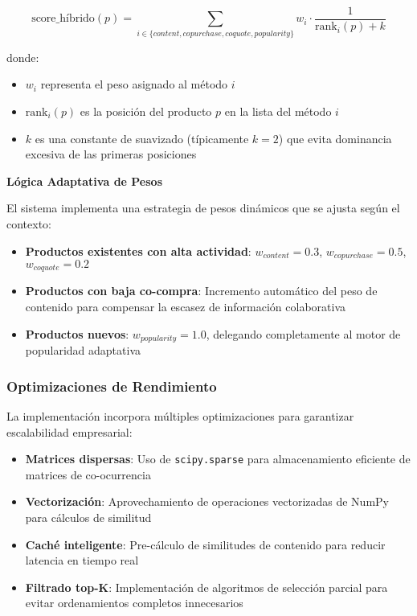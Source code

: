 \documentclass[twocolumn]{article}
\begin{document}
\[
\text{score\_híbrido}(p) = \sum_{i \in \{content, copurchase, coquote, popularity\}} w_i \cdot \frac{1}{\text{rank}_i(p) + k}
\]

donde:
\begin{itemize}
    \item $w_i$ representa el peso asignado al método $i$
    \item $\text{rank}_i(p)$ es la posición del producto $p$ en la lista del método $i$
    \item $k$ es una constante de suavizado (típicamente $k=2$) que evita dominancia excesiva de las primeras posiciones
\end{itemize}

\textbf{Lógica Adaptativa de Pesos}

El sistema implementa una estrategia de pesos dinámicos que se ajusta según el contexto:

\begin{itemize}
    \item \textbf{Productos existentes con alta actividad}: $w_{content} = 0.3$, $w_{copurchase} = 0.5$, $w_{coquote} = 0.2$
    \item \textbf{Productos con baja co-compra}: Incremento automático del peso de contenido para compensar la escasez de información colaborativa
    \item \textbf{Productos nuevos}: $w_{popularity} = 1.0$, delegando completamente al motor de popularidad adaptativa
\end{itemize}

\subsubsection{Optimizaciones de Rendimiento}

La implementación incorpora múltiples optimizaciones para garantizar escalabilidad empresarial:

\begin{itemize}
    \item \textbf{Matrices dispersas}: Uso de \texttt{scipy.sparse} para almacenamiento eficiente de matrices de co-ocurrencia
    \item \textbf{Vectorización}: Aprovechamiento de operaciones vectorizadas de NumPy para cálculos de similitud
    \item \textbf{Caché inteligente}: Pre-cálculo de similitudes de contenido para reducir latencia en tiempo real
    \item \textbf{Filtrado top-K}: Implementación de algoritmos de selección parcial para evitar ordenamientos completos innecesarios
\end{itemize}
\end{document}
